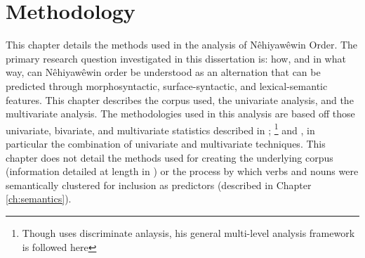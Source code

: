 	\chapter{Methodology}
	\label{ch:method}
This chapter details the methods used in the analysis of Nêhiyawêwin Order. The primary research question investigated in this dissertation is: how, and in what way, can Nêhiyawêwin order be understood as an alternation that can be predicted through morphosyntactic, surface-syntactic, and lexical-semantic features. This chapter describes the corpus used, the univariate analysis, and the multivariate analysis. The methodologies used in this analysis are based off those univariate, bivariate, and multivariate statistics described in  \citet{divjak2006ways, bresnan2007predicting}; \citet{gries2003multifactorial}\footnote{Though \citet{gries2003multifactorial} uses discriminate anlaysis, his general multi-level analysis framework is followed here} and \citet{arppe2008univariate}, in particular the combination of univariate and multivariate techniques. This chapter does not detail the methods used for creating the underlying corpus (information detailed at length in \cite{arppe1945morphosyntactically}) or the process by which verbs and nouns were semantically clustered for inclusion as predictors (described in Chapter \ref{ch:semantics}).

